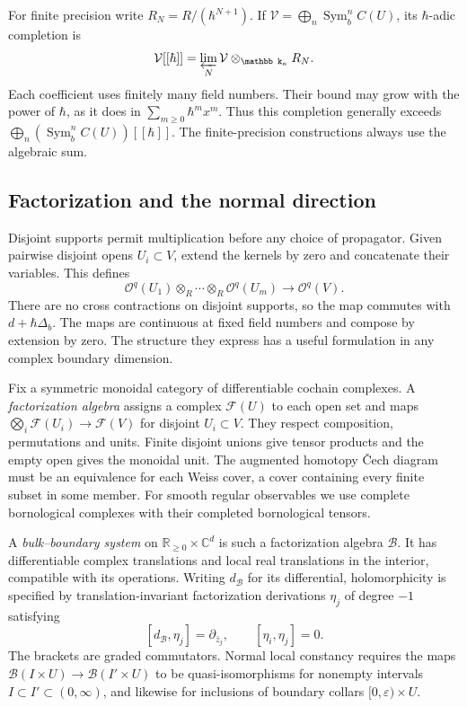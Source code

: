 For\label{pcsm:def:hbar-completion} finite precision write \(R_N=R/(\hbar^{N+1})\).
If \(\mathcal V=\bigoplus_n\operatorname{Sym}_b^n C(U)\), its
\(\hbar\)-adic completion is
\[
 \mathcal V[[\hbar]]=\varprojlim_N
                  \mathcal V\otimes_{\mathbb k_\kappa}R_N.
\]
Each coefficient uses finitely many field numbers.
Their bound may grow with the power of \(\hbar\), as it does in
\(\sum_{m\geq0}\hbar^m x^m\).
Thus this completion generally exceeds
\(\bigoplus_n(\operatorname{Sym}_b^n C(U))[[\hbar]]\).
The finite-precision constructions always use the algebraic sum.

\subsection{Factorization and the normal direction}

Disjoint supports permit multiplication before any choice of
propagator. Given pairwise disjoint opens \(U_i\subset V\), extend
the kernels by zero and concatenate their variables. This defines
\[
 \mathcal O^q(U_1)\otimes_R\cdots\otimes_R\mathcal O^q(U_m)
          \longrightarrow\mathcal O^q(V).
\]
There are no cross contractions on disjoint supports, so the map
commutes with \(d+\hbar\Delta_b\).
The maps are continuous at fixed field numbers and compose by
extension by zero. The structure they express has a useful formulation
in any complex boundary dimension.

\begin{definition}\label{fs:def:bulk-boundary}
Fix a symmetric monoidal category of differentiable cochain complexes.
A \emph{factorization algebra} assigns a complex
\(\mathcal F(U)\) to each open set and maps
\(\bigotimes_i\mathcal F(U_i)\to\mathcal F(V)\) for disjoint
\(U_i\subset V\). They respect composition, permutations and units.
Finite disjoint unions give tensor products and the empty open gives
the monoidal unit. The augmented homotopy \v{C}ech diagram must be an
equivalence for each Weiss cover, a cover containing every finite
subset in some member.
For smooth regular observables we use complete bornological complexes
with their completed bornological tensors.

A \emph{bulk--boundary system} on
\(\mathbb R_{\geq0}\times\mathbb C^d\) is such a factorization
algebra \(\mathcal B\).
It has differentiable complex translations and local real translations
in the interior, compatible with its operations. Writing \(d_{\mathcal B}\) for its differential,
holomorphicity is specified by translation-invariant factorization
derivations \(\eta_j\) of degree \(-1\) satisfying
\[
 [d_{\mathcal B},\eta_j]=\partial_{\bar z_j},\qquad
 [\eta_i,\eta_j]=0.
\]
The brackets are graded commutators.
Normal local constancy requires the maps
\(\mathcal B(I\times U)\to\mathcal B(I'\times U)\)
to be quasi-isomorphisms for nonempty intervals
\(I\subset I'\subset(0,\infty)\), and likewise for inclusions
of boundary collars \([0,\varepsilon)\times U\).
\end{definition}

